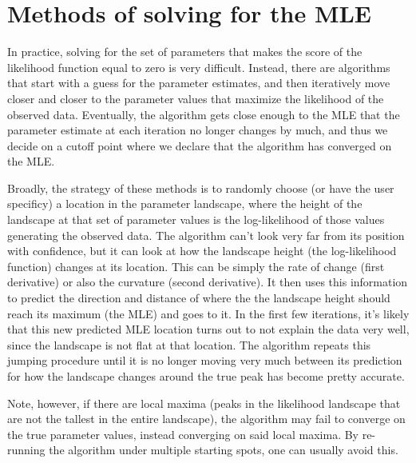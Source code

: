 \documentclass[12pt]{article}
\begin{document}
\section{Methods of solving for the MLE}
In practice, solving for the set of parameters that makes the score of the likelihood function equal to zero is very difficult.
Instead, there are algorithms that start with a guess for the parameter estimates, and then iteratively move closer and closer to the parameter values that maximize the likelihood of the observed data.
Eventually, the algorithm gets close enough to the MLE that the parameter estimate at each iteration no longer changes by much, and thus we decide on a cutoff point where we declare that the algorithm has converged on the MLE.

Broadly, the strategy of these methods is to randomly choose (or have the user specificy) a location in the parameter landscape, where the height of the landscape at that set of parameter values is the log-likelihood of those values generating the observed data.
The algorithm can't look very far from its position with confidence, but it can look at how the landscape height (the log-likelihood function) changes at its location.
This can be simply the rate of change (first derivative) or also the curvature (second derivative).
It then uses this information to predict the direction and distance of where the the landscape height should reach its maximum (the MLE) and goes to it.
In the first few iterations, it's likely that this new predicted MLE location turns out to not explain the data very well, since the landscape is not flat at that location.
The algorithm  repeats this jumping procedure until it is no longer moving very much between its prediction for how the landscape changes around the true peak has become pretty accurate.

Note, however, if there are local maxima (peaks in the likelihood landscape that are not the tallest in the entire landscape), the algorithm may fail to converge on the true parameter values, instead converging on said local maxima.
By re-running the algorithm under multiple starting spots, one can usually avoid this.
\end{document}
